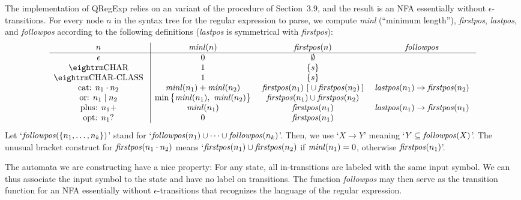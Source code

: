 The implementation of {\sf QRegExp} relies on an variant of the procedure of Section~3.9, and the result is an NFA essentially without $\epsilon$-transitions.  For every node $n$ in the syntax tree for the regular expression to parse, we compute {\it minl} (``minimum length''), {\it firstpos}, {\it lastpos}, and {\it followpos\/} according to the following definitions ({\it lastpos\/} is symmetrical with {\it firstpos\/}):  $$\vbox{\halign{\g{#}\vrule && \g{$#$} \cr
  $n$                   & {\it minl}(n)     & {\it firstpos}(n)                 & {\it followpos} \cr
\noalign{\hrule}
  $\epsilon$            & 0                 & \emptyset \cr
  \tok{char}            & 1                 & \{s\} \cr
  \tok{char-class}      & 1                 & \{s\} \cr
  cat: $n_1 \cdot n_2$  & {\it minl}(n_1) +
                          {\it minl}(n_2)   & {\it firstpos}(n_1)
                                              \ [{} \cup {\it firstpos}(n_2)\,] & {\it lastpos}(n_1) \rightarrow
                                                                                  {\it firstpos}(n_2) \cr
  or: $n_1 \mid n_2$    & \min\smash{\bigl\{}{\it minl}(n_1),
                          \ {\it minl}(n_2)\smash{\bigr\}}
                                            & {\it firstpos}(n_1) \cup
                                              {\it firstpos}(n_2) \cr
  plus: $n_1+$          & {\it minl}(n_1)   & {\it firstpos}(n_1)               & {\it lastpos}(n_1) \rightarrow
                                                                                  {\it firstpos}(n_1) \cr
  opt: $n_1?$           & 0                 & {\it firstpos}(n_1) \cr
}}$$  Let `${\it followpos}(\{n_1, \ldots, n_k\})$' stand for `${\it followpos}(n_1) \cup \cdots \cup {\it followpos}(n_k)$'.  Then, we use `$X \rightarrow Y$' meaning `$Y \subseteq {\it followpos}(X)$'.  The unusual bracket construct for ${\it firstpos}(n_1 \cdot n_2)$ means `${\it firstpos}(n_1) \cup {\it firstpos}(n_2)$ if ${\it minl}(n_1) = 0$, otherwise ${\it firstpos}(n_1)$'.

The automata we are constructing have a nice property:  For any state, all in-transitions are labeled with the same input symbol.  We can thus associate the input symbol to the state and have no label on transitions.  The function {\it followpos\/} may then serve as the transition function for an NFA essentially without $\epsilon$-transitions that recognizes the language of the regular expression.

